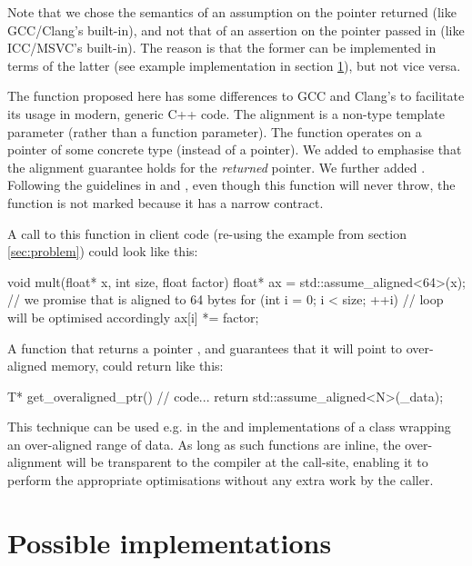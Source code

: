 Note that we chose the semantics of an assumption on the pointer returned (like GCC/Clang's built-in), and not that of an assertion on the pointer passed in (like ICC/MSVC's built-in). The reason is that the former can be implemented in terms of the latter (see example implementation in section \ref{sec:impl}), but not vice versa.

The function proposed here has some differences to GCC and Clang's  to facilitate its usage in modern, generic C++ code. The alignment  is a non-type template parameter (rather than a function parameter). The function operates on a pointer of some concrete type  (instead of a  pointer). We added \tcode{[[nodiscard]]} to emphasise that the alignment guarantee holds for the \emph{returned} pointer. We further added . Following the guidelines in \cite{N3279} and \cite{P0884R0}, even though this function will never throw, the function is not marked  because it has a narrow contract.

A call to this function in client code (re-using the example from section \ref{sec:problem}) could look like this:

\begin{codeblock}
void mult(float* x, int size, float factor)
{
    float* ax = std::assume_aligned<64>(x);   // we promise that  is aligned to 64 bytes
    for (int i = 0; i < size; ++i)            // loop will be optimised accordingly
        ax[i] *= factor;
}
\end{codeblock}

A function that returns a pointer , and guarantees that it will point to over-aligned memory, could return like this:

\begin{codeblock}
T* get_overaligned_ptr()
{
    // code...
    return std::assume_aligned<N>(_data);
}
\end{codeblock}

This technique can be used e.g. in the  and  implementations of a class wrapping an over-aligned range of data. As long as such functions are inline, the over-alignment will be transparent to the compiler at the call-site, enabling it to perform the appropriate optimisations without any extra work by the caller.

\section{Possible implementations}
\label{sec:impl}

